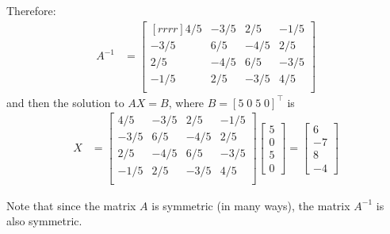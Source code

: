 \begin{example}
Therefore:
%
\begin{align*}
A^{-1} & = 
\begin{bmatrix}[rrrr]
4/5  & -3/5 & 2/5 & - 1/5  \\
-3/5 & 6/5 & -4/5 & 2/5 \\
2/5 & -4/5 & 6/5 & -3/5 \\
-1/5 & 2/5 & -3/5 & 4/5 \\
\end{bmatrix}
\end{align*}
and then the solution to $AX=B$, where $B=[5\;0\;5\;0]^{\intercal}$ is
%
\begin{align*}
X & = 
\begin{bmatrix}
4/5  & -3/5 & 2/5 & - 1/5  \\
-3/5 & 6/5 & -4/5 & 2/5 \\
2/5 & -4/5 & 6/5 & -3/5 \\
-1/5 & 2/5 & -3/5 & 4/5 \\
\end{bmatrix}
\begin{bmatrix}
5 \\ 0 \\ 5 \\ 0
\end{bmatrix}
= \begin{bmatrix}
6 \\ -7 \\ 8 \\ -4
\end{bmatrix}
\end{align*}

Note that since the matrix $A$ is symmetric (in many ways), the matrix $A^{-1}$ is also symmetric. 



\end{example}


